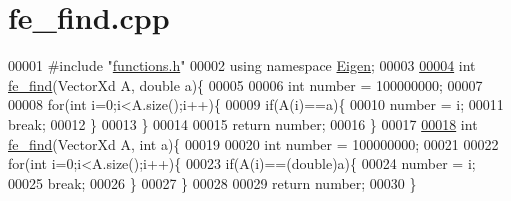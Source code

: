 \hypertarget{fe__find_8cpp_source}{}\section{fe\+\_\+find.\+cpp}
\label{fe__find_8cpp_source}

\begin{DoxyCode}
00001 \textcolor{preprocessor}{#include "\hyperlink{functions_8h}{functions.h}"}
00002 \textcolor{keyword}{using namespace }\hyperlink{namespace_eigen}{Eigen};
00003 
\hyperlink{fe__find_8cpp_a983304137f9a961469a558437d5d2d59}{00004} \textcolor{keywordtype}{int} \hyperlink{fe__find_8cpp_a983304137f9a961469a558437d5d2d59}{fe\_find}(VectorXd A, \textcolor{keywordtype}{double} a)\{
00005 
00006   \textcolor{keywordtype}{int} number = 100000000;
00007 
00008   \textcolor{keywordflow}{for}(\textcolor{keywordtype}{int} i=0;i<A.size();i++)\{
00009     \textcolor{keywordflow}{if}(A(i)==a)\{
00010       number = i;
00011       \textcolor{keywordflow}{break};
00012     \}
00013   \}
00014 
00015   \textcolor{keywordflow}{return} number;
00016 \}
00017 
\hyperlink{fe__find_8cpp_a0d42c56d98efb23079057340a7133e89}{00018} \textcolor{keywordtype}{int} \hyperlink{fe__find_8cpp_a983304137f9a961469a558437d5d2d59}{fe\_find}(VectorXd A, \textcolor{keywordtype}{int} a)\{
00019 
00020   \textcolor{keywordtype}{int} number = 100000000;
00021 
00022   \textcolor{keywordflow}{for}(\textcolor{keywordtype}{int} i=0;i<A.size();i++)\{
00023     \textcolor{keywordflow}{if}(A(i)==(double)a)\{
00024       number = i;
00025       \textcolor{keywordflow}{break};
00026     \}
00027   \}
00028 
00029   \textcolor{keywordflow}{return} number;
00030 \}
\end{DoxyCode}
